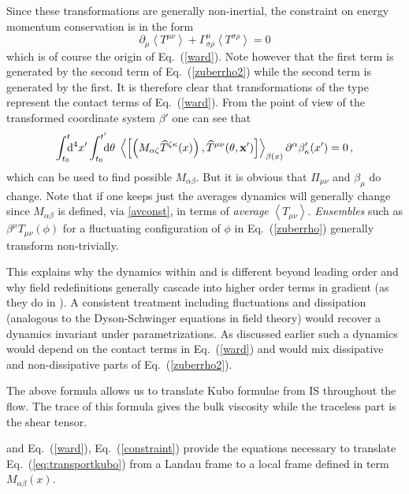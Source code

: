 \documentclass[12pt,onecolumn,showpacs,amssymb,aps,nofootinbib,floatfix]{revtex4-2}
\newcommand{\ave}[1]{\left\langle #1 \right\rangle}
\renewcommand{\eqref}[1]{Eq.~(\ref{#1})}
\newcommand{\di}{{\rm d}}
\def\wT{{\widehat T}}
\begin{document}
Since these transformations are generally non-inertial, the constraint on energy momentum conservation is in the form
\begin{equation}
  \partial_\mu \ave{T^{\mu \nu}}+\Gamma_{\sigma \rho}^\mu\ave{T^{\sigma \rho}}=0
  \label{conserv}
  \end{equation}
which is of course the origin of \eqref{ward}.   Note however that the first term is generated by the second term of \eqref{zuberrho2} while the second term is generated by the first.    It is therefore clear that transformations of the type represent the contact terms of \eqref{ward}.     From the point of view of the transformed coordinate system $\beta'$ one can see that
	\begin{equation}
		\label{constraint}
		\int_{t_0}^{t} \!\!\! \di^4 x'  \int_{t_0}^{t'} \!\!\! \di \theta \; \ave{
			\left[ \left( M_{\alpha \zeta} \wT^{\zeta \kappa}(x)\right),\wT^{\mu\nu}(\theta,{\bf x}')\right] }_{\beta(x)} \partial^\alpha  \beta_\kappa'(x')  =0\,,
	\end{equation}
which can be used to find possible $M_{\alpha \beta}$.
	But it is obvious that $\Pi_{\mu \nu}$ and $\beta_\mu$ do change.  Note that if one keeps just the averages dynamics will generally change since $M_{\alpha \beta}$ is defined, via
\ref{avconst}, in terms of {\em average} $\ave{T_{\mu \nu}}$.  {\em
Ensembles} such as $\beta^\mu T_{\mu \nu}(\phi)$ for a fluctuating
configuration of $\phi$ in \eqref{zuberrho} generally transform
non-trivially.

This explains why the dynamics within \cite{bdnk} and \cite{IsraelStewart} is different beyond leading order\color{black} and why field redefinitions generally cascade into higher order terms in gradient (as they do in \cite{yarom}).  A consistent treatment including fluctuations and dissipation (analogous to the Dyson-Schwinger equations in field theory) would recover a dynamics invariant under parametrizations.   As discussed earlier such a dynamics would depend on the contact terms in \eqref{ward} and would mix dissipative and non-dissipative parts of \eqref{zuberrho2}.

	The above formula \color{black} allows us to translate Kubo formulae from IS throughout the flow.  The trace of this formula gives the bulk viscosity while the traceless part is the shear tensor.

	and \eqref{ward}, \eqref{constraint} provide the equations necessary to translate \eqref{eq:transportkubo} from a Landau frame to a local frame defined in term $M_{\alpha \beta}(x)$.
\end{document}
